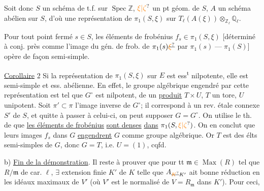   Soit donc $S$ un schéma  de t.f. sur $\operatorname{Spec}\mathbb{Z}$, $\unsure{\xi|\zeta}$ un pt géom. de $S$, $A$ un schéma abélien sur $S$,  d'où une représentation de $\pi_1(S,\xi)$ sur  $T_\ell(A(\xi))\otimes_{\mathbb{Z}_\ell}\mathbb{Q}_\ell$.

Pour tout point fermé $s\in S$, les éléments de frobénius $f_s\in\pi_1(S,\xi)$ [déterminé à  conj. près comme l'image du gén. de frob. de $\pi_1(s)\deleted{\unsure{\xi}}$ par $\pi_1(s)\mathrel{\text{---}}\pi_1(S)$] opère  de façon semi-simple.

\uline{Corollaire} 2 Si la représentation de $\pi_1(S,\xi)$ sur $E$ est  ess\textsuperscript{t} nilpotente, elle est  semi-simple et ess. abélienne.
En effet, le groupe algébrique  engendré par cette représentation est tel que $G^\circ$ est nilpotent,   de  un \uline{produit}  $T\times U$, $T$ un tore, $U$ unipotent.  Soit $\pi'\subset\pi$ l'image inverse de $G^\circ$; il correspond à un rev.  étale connexe $S'$ de $S$, et quitte à passer à celui-ci, on peut supposer $G=G^\circ$. On utilise le th. de \uline{} que \uline{les éléments de frobénius} \uline{sont denses} \uline{dans} $\pi_1(S,\unsure{\xi|\zeta})$. On en conclut que leurs images $f_s$ dans $G$ \uline{engendrent} $G$ comme groupe algébrique. Or $T$ est  des élts semi-simples de $G$, donc $G=T$, i.e. $U=(1)$, cqfd.

b) \uline{Fin de la démonstration}. Il reste à prouver que  pour tt $\mathfrak m\in\operatorname{Max}(R)$ tel que $R/\mathfrak m$ de car. $\ell$, $\exists$ extension finie $K'$ de $K$ telle que $A_{\deleted{\unsure{K}}K'}$ ait bonne réduction en les idéaux maximaux de $V'$ (où $V'$ est le normalisé de $V=R_{\mathfrak m}$ dans $K'$). Pour ceci, 

